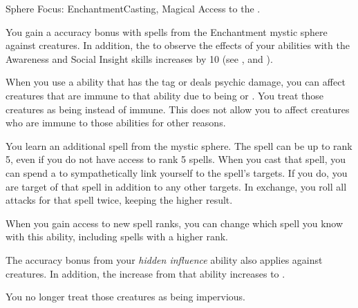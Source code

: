   \begin{magicalfeat}{Sphere Focus: Enchantment}{Casting, Magical}
    \featpre Access to the  .

     You gain a  accuracy bonus with spells from the Enchantment mystic sphere against \unaware creatures.
    In addition, the  to observe the effects of your  abilities with the Awareness and Social Insight skills increases by 10 (see , and ).

     When you use a \magical ability that has the  tag or deals psychic damage, you can affect creatures that are immune to that ability due to being  or .
    You treat those creatures as being \impervious instead of immune.
    This does not allow you to affect creatures who are immune to those abilities for other reasons.

     You learn an additional  spell from the  mystic sphere.
    The spell can be up to rank 5, even if you do not have access to rank 5 spells.
    When you cast that spell, you can spend a  to sympathetically link yourself to the spell's targets.
    If you do, you are target of that spell in addition to any other targets.
    In exchange, you roll all attacks for that spell twice, keeping the higher result.

    When you gain access to new spell ranks, you can change which spell you know with this ability, including spells with a higher rank.

     The accuracy bonus from your \textit{hidden influence} ability also applies against \partiallyunaware creatures.
    In addition, the  increase from that ability increases to .

     You no longer treat those creatures as being impervious.
  \end{magicalfeat}


